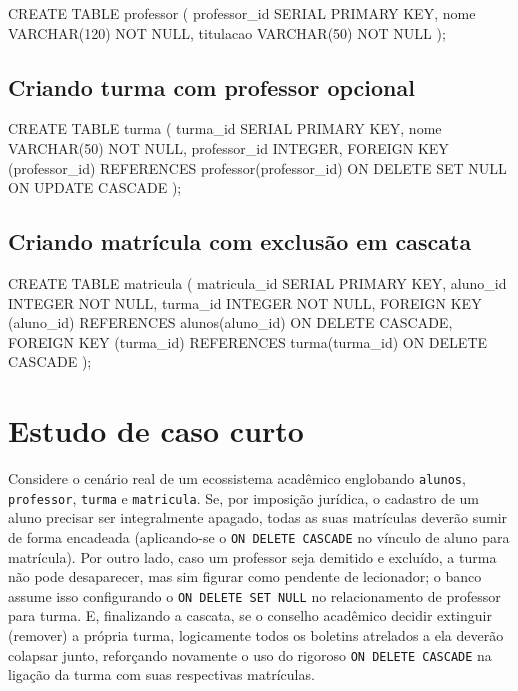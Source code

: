 \begin{sqlcode}
CREATE TABLE professor (
    professor_id SERIAL PRIMARY KEY,
    nome VARCHAR(120) NOT NULL,
    titulacao VARCHAR(50) NOT NULL
);
\end{sqlcode}

\subsection{Criando turma com professor opcional}

\begin{sqlcode}
CREATE TABLE turma (
    turma_id SERIAL PRIMARY KEY,
    nome VARCHAR(50) NOT NULL,
    professor_id INTEGER,
    FOREIGN KEY (professor_id)
        REFERENCES professor(professor_id)
        ON DELETE SET NULL
        ON UPDATE CASCADE
);
\end{sqlcode}

\subsection{Criando matrícula com exclusão em cascata}

\begin{sqlcode}
CREATE TABLE matricula (
    matricula_id SERIAL PRIMARY KEY,
    aluno_id INTEGER NOT NULL,
    turma_id INTEGER NOT NULL,
    FOREIGN KEY (aluno_id)
        REFERENCES alunos(aluno_id)
        ON DELETE CASCADE,
    FOREIGN KEY (turma_id)
        REFERENCES turma(turma_id)
        ON DELETE CASCADE
);
\end{sqlcode}

\section{Estudo de caso curto}

Considere o cenário real de um ecossistema acadêmico englobando \texttt{alunos}, \texttt{professor}, \texttt{turma} e \texttt{matricula}. Se, por imposição jurídica, o cadastro de um aluno precisar ser integralmente apagado, todas as suas matrículas deverão sumir de forma encadeada (aplicando-se o \texttt{ON DELETE CASCADE} no vínculo de aluno para matrícula). Por outro lado, caso um professor seja demitido e excluído, a turma não pode desaparecer, mas sim figurar como pendente de lecionador; o banco assume isso configurando o \texttt{ON DELETE SET NULL} no relacionamento de professor para turma. E, finalizando a cascata, se o conselho acadêmico decidir extinguir (remover) a própria turma, logicamente todos os boletins atrelados a ela deverão colapsar junto, reforçando novamente o uso do rigoroso \texttt{ON DELETE CASCADE} na ligação da turma com suas respectivas matrículas.

